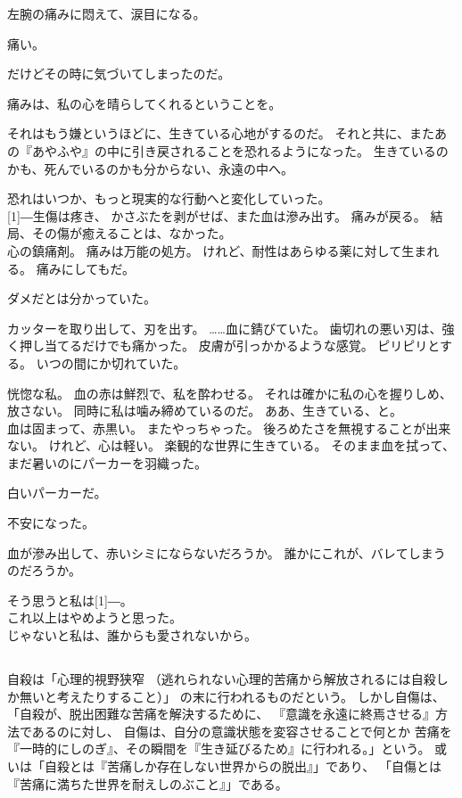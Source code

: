\documentclass[autodetect-engine,dvipdfmx-if-dvi,a5paper,ja=standard,twoside,titlepage,final,twocolumn]{ltjtbook}
\begin{document}
左腕の痛みに悶えて、涙目になる。

痛い。

だけどその時に気づいてしまったのだ。

痛みは、私の心を晴らしてくれるということを。

それはもう嫌というほどに、生きている心地がするのだ。
それと共に、またあの『あやふや』の中に引き戻されることを恐れるようになった。
生きているのかも、死んでいるのかも分からない、永遠の中へ。

恐れはいつか、もっと現実的な行動へと変化していった。\\

\scalebox{3}[1]{―}生傷は疼き、
かさぶたを剥がせば、また血は滲み出す。
痛みが戻る。
結局、その傷が癒えることは、なかった。\\

心の鎮痛剤。
痛みは万能の処方。
けれど、耐性はあらゆる薬に対して生まれる。
痛みにしてもだ。

ダメだとは分かっていた。

カッターを取り出して、刃を出す。
……血に錆びていた。
歯切れの悪い刃は、強く押し当てるだけでも痛かった。
皮膚が引っかかるような感覚。
ピリピリとする。
いつの間にか切れていた。

恍惚な私。
血の赤は鮮烈で、私を酔わせる。
それは確かに私の心を握りしめ、放さない。
同時に私は噛み締めているのだ。
ああ、生きている、と。\\

血は固まって、赤黒い。
またやっちゃった。
後ろめたさを無視することが出来ない。
けれど、心は軽い。
楽観的な世界に生きている。
そのまま血を拭って、まだ暑いのにパーカーを羽織った。

白いパーカーだ。

不安になった。

血が滲み出して、赤いシミにならないだろうか。
誰かにこれが、バレてしまうのだろうか。

そう思うと私は\scalebox{3}[1]{―}。\\

これ以上はやめようと思った。\\

じゃないと私は、誰からも愛されないから。

\subsection*{}
自殺は「心理的視野狭窄
（逃れられない心理的苦痛から解放されるには自殺しか無いと考えたりすること）」
の末に行われるものだという。
しかし自傷は、「自殺が、脱出困難な苦痛を解決するために、
『意識を永遠に終焉させる』方法であるのに対し、
自傷は、自分の意識状態を変容させることで何とか
苦痛を『一時的にしのぎ』、その瞬間を『生き延びるため』に行われる。」という。
或いは「自殺とは『苦痛しか存在しない世界からの脱出』」であり、
「自傷とは『苦痛に満ちた世界を耐えしのぶこと』」である。\\
\end{document}
